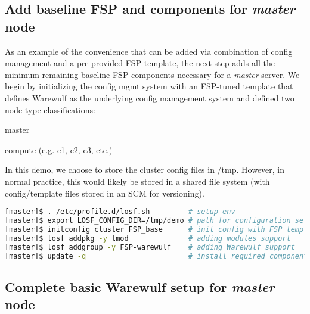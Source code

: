 \documentclass[letterpaper]{article}
\begin{document}

\subsection{Add baseline FSP and components for {\em master} node}

As an example of the convenience that can be added via combination of config
management and a pre-provided FSP template, the next step adds all the minimum
remaining baseline FSP components necessary for a {\em master} server. We begin
by initializing the config mgmt system with an FSP-tuned template that defines
Warewulf as the underlying config management system and defined two node type
classifications:
\begin{itemize*}
\item master
\item compute (e.g. c1, c2, c3, etc.)
\end{itemize*}
In this demo, we choose to store the cluster config files in /tmp. However, in
normal practice, this would likely be stored in a shared file system (with
config/template files stored in an SCM for versioning).

\vspace*{0.2cm}


\begin{lstlisting}[language=bash,keywords={}]
[master]$ . /etc/profile.d/losf.sh         # setup env
[master]$ export LOSF_CONFIG_DIR=/tmp/demo # path for configuration setup
[master]$ initconfig cluster FSP_base      # init config with FSP template
[master]$ losf addpkg -y lmod              # adding modules support
[master]$ losf addgroup -y FSP-warewulf    # adding Warewulf support
[master]$ update -q                        # install required components
\end{lstlisting}


\subsection{Complete basic Warewulf setup for {\em master} node}
\end{document}
